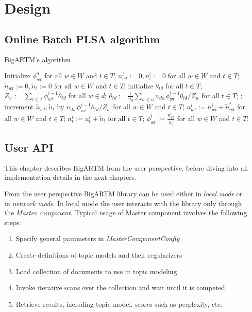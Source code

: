 \documentclass[11pt,a4paper,twoside]{report}
\begin{document}
\section{Design}

\subsection{Online Batch PLSA algorithm}

\begin{algorithm}
\caption{BigARTM's algorithm}
\label{fig:plsa_alg}
\begin{algorithmic}[1]
\STATE Initialize $\phi^0_{wt}$ for all $w \in W$ and $t \in T$;
    \STATE $n^i_{wt} := 0, n^i_t := 0$ for all $w \in W$ and $t \in T$;
		\STATE $\tilde n_{wt} := 0, \tilde n_t := 0$ for all $w \in W$ and $t \in T$;
			\STATE initialize $\theta_{td}$ for all $t \in T$;
			\REPEAT
				\STATE $Z_w := \sum_{t \in T} \phi^{i-1}_{wt} \theta_{td}$ for all $w \in d$;
				\STATE $\theta_{td} := \frac{1}{n_d} \sum_{w \in d} n_{dw} \phi^{i-1}_{wt} \theta_{td} / Z_w$
                       for all $t \in T$;
			;
			\STATE increment $\tilde n_{wt}, \tilde n_t$ by $n_{dw} \phi^{i-1}_{wt} \theta_{td} / Z_w$
                   for all $w \in W$ and $t \in T$;
		\ENDFOR
        \STATE $n^i_{wt} := n^i_{wt} + \tilde n^i_{wt}$ for all $w \in W$ and $t \in T$;
        \STATE $n^i_t := n^i_t + \tilde n_t$ for all $t \in T$;
    \ENDFOR
	\STATE $\phi^{i}_{wt} := \frac{n^i_{wt}}{n^i_{t}}$
           for all $w \in W$ and $t \in T$;
\ENDFOR
\end{algorithmic}
\end{algorithm}


\subsection{User API}
This chapter describes BigARTM from the user perspective, before diving into all implementation details in the next chapters.

From the user perspective BigARTM library can be used either in \emph{local mode} or in \emph{network mode}.
In local mode the user interacts with the library only through the \emph{Master component}.
Typical usage of Master component involves the following steps:
\begin{enumerate}
\item Specify general parameters in \emph{MasterComponentConfig}
\item Create definitions of topic models and their regularizers
\item Load collection of documents to use in topic modeling
\item Invoke iterative scans over the collection and wait until it is competed
\item Retrieve results, including topic model, scores such as perplexity, etc.
\end{enumerate}
\end{document}
